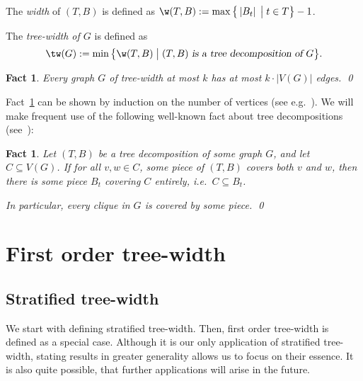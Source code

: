 \documentclass{LMCS}
\newtheorem{fct}[thm]{Fact}
\newcommand{\bigmid}{\;\big|\;}
\begin{document}
\noindent 
The \emph{width} of $(T,B)$ is defined as $\w(T,B):=
\max\big\{\left|B_t\right|\bigmid t\in T\big\}-1$. 

The \emph{tree-width of $G$} is defined as
\[
	\tw(G):= 
	\min\big\{\w(T,B)\bigmid (T,B) \textsl{ is a tree decomposition of }G\big\}.
\]

\begin{fct}\label{fact:number-of-edges}
	Every graph $G$ of tree-width at most $k$ has at most
	$k\cdot\left|V(G)\right|$ edges.
	\qed\end{fct}

Fact~\ref{fact:number-of-edges} can be shown by induction on the number of vertices
(see e.g.\ \cite{FG06}).
We will make frequent use of the following 
well-known fact about tree decompositions (see~\cite{die06}): 

\begin{fct}\label{fact:cliques}
Let $(T,B)$ be a tree decomposition of some graph $G$, 
and let $C\subseteq V(G)$. 
If for all $v,w\in C$, some piece of $(T,B)$ covers both $v$ and $w$, 
then there is some piece $B_t$ covering $C$ entirely, i.e.\ $C\subseteq B_t$. 

In particular, every clique in $G$ is covered by some piece. 
\qed\end{fct}




\section{First order tree-width}\label{section:fotw}

\subsection{Stratified tree-width}

We start with defining stratified tree-width. 
Then, first order tree-width is defined as a special case. 
Although it is our only application of stratified tree-width, 
stating results in greater generality allows us to focus on their essence. 
It is also quite possible, that further applications will arise in the future. 
\end{document}
